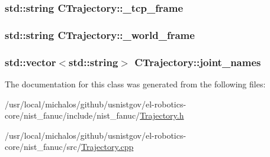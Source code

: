 \hypertarget{classCTrajectory_a53080e6e68f5ac166e9c7ca4fbe920c2}{
\subsubsection[{\-\_\-tcp\-\_\-frame}]{\setlength{\rightskip}{0pt plus 5cm}std\-::string C\-Trajectory\-::\-\_\-tcp\-\_\-frame}}\label{classCTrajectory_a53080e6e68f5ac166e9c7ca4fbe920c2}
\hypertarget{classCTrajectory_af1ee8c76ae0225ca65055ba87b338569}{
\subsubsection[{\-\_\-world\-\_\-frame}]{\setlength{\rightskip}{0pt plus 5cm}std\-::string C\-Trajectory\-::\-\_\-world\-\_\-frame}}\label{classCTrajectory_af1ee8c76ae0225ca65055ba87b338569}
\hypertarget{classCTrajectory_a8ccdbf828e5e09e82be6eb896aace3d7}{
\subsubsection[{joint\-\_\-names}]{\setlength{\rightskip}{0pt plus 5cm}std\-::vector$<$std\-::string$>$ C\-Trajectory\-::joint\-\_\-names}}\label{classCTrajectory_a8ccdbf828e5e09e82be6eb896aace3d7}


The documentation for this class was generated from the following files\-:\begin{DoxyCompactItemize}
\item 
/usr/local/michalos/github/usnistgov/el-\/robotics-\/core/nist\-\_\-fanuc/include/nist\-\_\-fanuc/\hyperlink{Trajectory_8h}{Trajectory.\-h}\item 
/usr/local/michalos/github/usnistgov/el-\/robotics-\/core/nist\-\_\-fanuc/src/\hyperlink{Trajectory_8cpp}{Trajectory.\-cpp}\end{DoxyCompactItemize}
